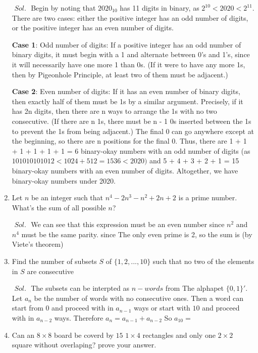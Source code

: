 \documentclass[a4paper]{article}
\theoremstyle{definition}
\begin{document}
\begin{enumerate}
\begin{tcolorbox}[width=\linewidth, sharp corners=all, colback=white!95!black]

$\textit{ Sol. }$
Begin by noting that ${2020}_{10}$ has 11 digits in binary, as $2^{10} < 2020 < 2^{11} $. There are
two cases: either the positive integer has an odd number of digits, or the positive integer has an
even number of digits.

\textbf{Case 1}: Odd number of digits:
If a positive integer has an odd number of binary digits, it must begin with a 1 and alternate
between 0's and 1's, since it will necessarily have one more 1 than 0s. (If it were to have any
more 1s, then by Pigeonhole Principle, at least two of them must be adjacent.)


\textbf{Case 2}: Even number of digits:
If it has an even number of binary digits, then exactly half of them must be 1s by a similar
argument. Precisely, if it has 2n digits, then there are n ways to arrange the 1s with no two
consecutive. (If there are n 1s, there must be n - 1 0s inserted between the 1s to prevent the
1s from being adjacent.) The final 0 can go anywhere except at the beginning, so there are n
positions for the final 0.
Thus, there are 1 + 1 + 1 + 1 + 1 + 1 = 6 binary-okay numbers with an odd number of digits (as
$101010101012 < 1024 + 512 = 1536 < 2020)$ and 5 + 4 + 3 + 2 + 1 = 15 binary-okay numbers
with an even number of digits. Altogether, we have  binary-okay numbers under 2020.
\end{tcolorbox}

\item Let $n$ be an integer such that $n^4 -2n^3 -n^2 +2n + 2$ is a prime number. What's the sum
of all possible $n$?


\begin{tcolorbox}[width=\linewidth, sharp corners=all, colback=white!95!black]

$\textit{ Sol. }$
We can see that this expression must be
an even number since $n^2$ and $n^4$ must be the same parity.
since The only even prime is 2, so the sum is (by Viete’s theorem)
\end{tcolorbox}
\item Find the number of subsets $S$ of $\{1,2,...,10\}$ such that no two of the elements in $S$ are consecutive

\begin{tcolorbox}[width=\linewidth, sharp corners=all, colback=white!95!black]

$\textit{ Sol. }$
The subsets can be interpted as $n-words$ from
The alphapet $ \{0,1\}'$.
Let $a_n$ be the number of words with no consecutive ones.
Then a word can start from 0 and proceed with in $a_{n-1}$
ways or start with $10$ and proceed with in $a_{n-2}$ ways.
Therefore $a_n = a_{n-1} + a_{n-2}$ So $a_10 =$ 
\end{tcolorbox}
\item Can an $8\times8$ board be coverd by $15$ $1\times4$ rectangles and only one $2\times2$ square without overlaping? prove your answer.



\end{enumerate}
\end{document}
